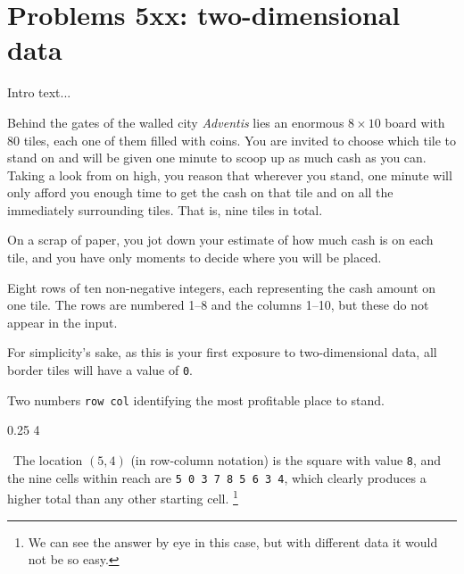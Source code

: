 
\chapter{Problems 5xx: two-dimensional data}

Intro text...


\clearpage


Behind the gates of the walled city \emph{Adventis} lies an enormous $8 \times 10$ board
with 80 tiles, each one of them filled with coins. You are invited to choose which tile
to stand on and will be given one minute to scoop up as much cash as you can. Taking a
look from on high, you reason that wherever you stand, one minute will only afford you
enough time to get the cash on that tile and on all the immediately surrounding tiles.
That is, nine tiles in total.

On a scrap of paper, you jot down your estimate of how much cash is on each tile, and you
have only moments to decide where you will be placed.

\Input Eight rows of ten non-negative integers, each representing the cash amount on one
tile. The rows are numbered 1--8 and the columns 1--10, but these do not appear in the input.

For simplicity's sake, as this is your first exposure to two-dimensional data, all border
tiles will have a value of \texttt{0}.

\Output Two numbers \texttt{row col} identifying the most profitable place to stand.

\Sample

       {0.2}{5 4}

\Explanation\ The location $(5,4)$ (in row-column notation) is the square with value
\texttt{8}, and the nine cells within reach are \texttt{5 0 3 7 8 5 6 3 4}, which clearly
produces a higher total than any other starting cell.%
\footnote{We can see the answer by eye in this case, but with different data it would not
be so easy.}

